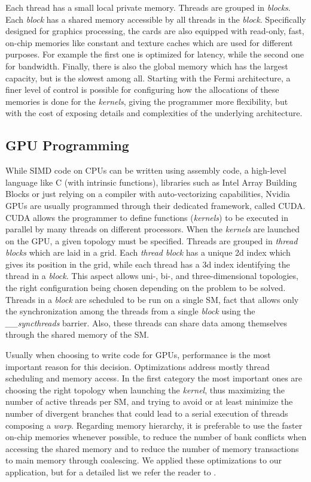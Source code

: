 Each thread has a small local private memory. Threads are grouped in \textit{blocks}. 
Each \textit{block} has a
shared memory accessible by all threads in the \textit{block}. Specifically
designed for graphics processing, the cards are also equipped with read-only,
fast, on-chip memories like constant and texture caches which are used for
different purposes. For example the first one is optimized for latency, while
the second one for bandwidth. Finally, there is also the global memory which has
the largest capacity, but is the slowest among all. Starting with the Fermi
architecture, a finer level of control is possible for configuring how the
allocations of these memories is done for the \textit{kernels}, giving the
programmer more flexibility, but with the cost of exposing details and
complexities of the underlying architecture.

\subsection{GPU Programming}

While SIMD code on CPUs can be written using assembly code, a high-level
language like C (with intrinsic functions), libraries such as Intel Array
Building Blocks or just relying on a compiler with auto-vectorizing
capabilities, Nvidia GPUs are usually  programmed through their dedicated
framework, called CUDA. CUDA allows the programmer to define functions
(\textit{kernels}) to be executed in parallel by many threads on different
processors. When the \textit{kernels} are launched on the GPU, a given topology
must be specified. Threads are grouped in \textit{thread blocks} which are laid
in a grid. Each \textit{thread block} has a unique 2d index which gives its
position in the grid, while each thread has a 3d index identifying the thread in
a \textit{block}. This aspect allows uni-, bi-, and three-dimensional
topologies, the right configuration being chosen depending on the problem to be
solved. Threads in a \textit{block} are scheduled to be run on a single SM, fact
that allows only the synchronization among the threads from a single
\textit{block} using the \emph{\_\_syncthreads} barrier. Also, these threads can
share data among themselves through the shared memory of the SM.

Usually when choosing to write code for GPUs, performance is the most important
reason for this decision. Optimizations address mostly thread scheduling and
memory access. In the first category the most important ones are choosing the
right topology when launching the \textit{kernel}, thus maximizing the number of
active threads per SM, and trying to avoid or at least minimize the number of
divergent branches that could lead to a serial execution of threads composing a
\textit{warp}. Regarding memory hierarchy, it is preferable to use the faster 
on-chip memories whenever possible, to reduce the number of bank conflicts when
accessing the shared memory and to reduce the number of memory transactions to
main memory through coalescing. We applied these optimizations to our
application, but for a detailed list we refer the reader to \cite{cuda}.
